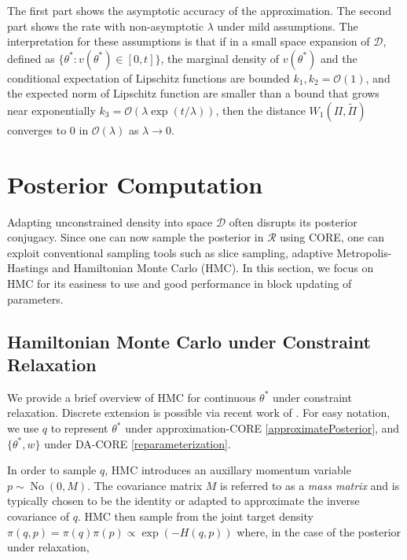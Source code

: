 \documentclass[10pt,fleqn]{article}
\newcommand{\mc}[1]{\mathcal{#1}}
\DeclareMathOperator{\No}{No}
\DeclareMathOperator{\1}{\mathbbm{1}}
\newcommand{\mass}{M} %
\begin{document}
        


The first part shows the asymptotic accuracy of the approximation. The second part shows the rate with non-asymptotic $\lambda$ under mild assumptions. The interpretation for these assumptions is that if in a small space expansion of $\mc D$, defined as $\{\theta^*: v(\theta^*)\in [0,t] \}$, the marginal density of $v(\theta^*)$ and the conditional expectation of Lipschitz functions are bounded $k_1,k_2= \mc O(1)$, and the expected norm of Lipschitz function are smaller than a bound that grows near exponentially $k_3 = \mc O(\lambda \exp(t/\lambda))$, then the distance $W_1(\Pi,\tilde\Pi)$ converges to $0$ in $\mc O(\lambda)$ as $\lambda\rightarrow 0$.



\section{Posterior Computation}

Adapting  unconstrained density into space $\mc D$ often disrupts its posterior conjugacy. Since one can now sample the posterior in $\mc R$ using
 CORE, one can exploit conventional sampling tools such as slice sampling, adaptive Metropolis-Hastings and Hamiltonian Monte Carlo (HMC). In this section, we focus on HMC for its easiness to use and good performance in block updating of parameters.

\subsection{Hamiltonian Monte Carlo under Constraint Relaxation}

We provide a brief overview of HMC for continuous $\theta^*$ under constraint relaxation. Discrete extension is possible via recent work of \cite{nishimura2017discontinuous}. For easy notation, we use $q$ to represent $\theta^*$ under approximation-CORE \eqref{approximatePosterior}, and $\{\theta^*, w\}$ under DA-CORE \eqref{reparameterization}.

In order to sample $q$, HMC introduces an auxillary momentum variable $p \sim \No(0, \mass)$. The covariance matrix $\mass$ is referred to as a \textit{mass matrix} and is typically chosen to be the identity or adapted to approximate the inverse covariance of $q$. HMC then sample from the joint target density $\pi(q, p) = \pi(q) \pi(p) \propto \exp (- H(q, p))$ where, in the case of the posterior under relaxation, 
\end{document}
